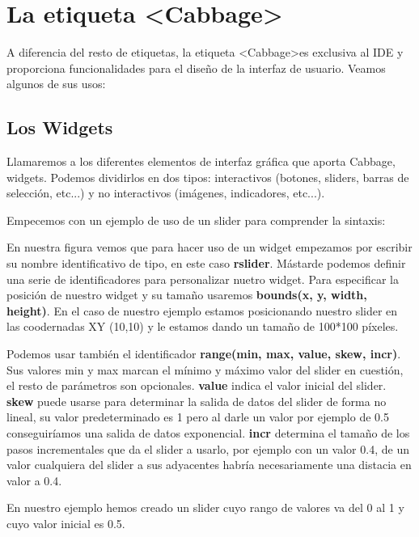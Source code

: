 \section{La etiqueta \textless Cabbage\textgreater}\label{sec:CabbageInst}

A diferencia del resto de etiquetas, la etiqueta \textless Cabbage\textgreater es exclusiva al IDE y proporciona funcionalidades para el diseño de la interfaz de usuario. Veamos algunos de sus usos:

\subsection{Los Widgets}

Llamaremos a los diferentes elementos de interfaz gráfica que aporta Cabbage, widgets. Podemos dividirlos en dos tipos: interactivos (botones, sliders, barras de selección, etc...) y no interactivos (imágenes, indicadores, etc...).

Empecemos con un ejemplo de uso de un slider para comprender la sintaxis:


En nuestra figura vemos que para hacer uso de un widget empezamos por escribir su nombre identificativo de tipo, en este caso \textbf{rslider}. Mástarde podemos definir una serie de identificadores para personalizar nuetro widget. Para especificar la posición de nuestro widget y su tamaño usaremos \textbf{bounds(x, y, width, height)}. En el caso de nuestro ejemplo estamos posicionando nuestro slider en las coodernadas XY (10,10) y le estamos dando un tamaño de 100*100 píxeles.

Podemos usar también el identificador \textbf{range(min, max, value, skew, incr)}. Sus valores min y max marcan el mínimo y máximo valor del slider en cuestión, el resto de parámetros son opcionales. \textbf{value} indica el valor inicial del slider. \textbf{skew} puede usarse para determinar la salida de datos del slider de forma no lineal, su valor predeterminado es 1 pero al darle un valor por ejemplo de 0.5 conseguiríamos una salida de datos exponencial. \textbf{incr} determina el tamaño de los pasos incrementales que da el slider a usarlo, por ejemplo con un valor 0.4, de un valor cualquiera del slider a sus adyacentes habría necesariamente una distacia en valor a 0.4.

En nuestro ejemplo hemos creado un slider cuyo rango de valores va del 0 al 1 y cuyo valor inicial es 0.5.

